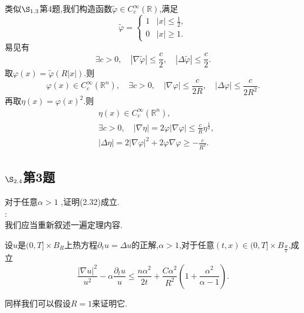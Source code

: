 \documentclass[12pt, a4paper]{ctexbook}
\begin{document}
    类似$\S_{1.3}$第4题,我们构造函数$\tilde{\varphi} \in C_c^{\infty}(\mathbb{R})$,满足
    \begin{equation*}
    \tilde{\varphi}=
    \begin{cases}
    1 & |x| \le \frac12,\\
    0 & |x| \ge 1.
    \end{cases}
    \end{equation*}
    易见有
    \begin{equation*}
    \exists c >0 ,\quad |\nabla \tilde{\varphi}|\le \frac{c}{2}, \quad |\Delta \tilde{\varphi}| \le \frac{c}{2}.
    \end{equation*}
    取$\varphi(x) = \tilde{\varphi}(R|x|)$.则
    \begin{equation*}
    \varphi(x)\in C_c^{\infty}(\mathbb{R}^n),\quad
    \exists c >0 ,\quad |\nabla \varphi|\le \frac{c}{2R}, \quad |\Delta \varphi| \le \frac{c}{2R^2}.
    \end{equation*}
    再取$\eta(x) = \varphi(x)^2$.则
    \begin{align*}
    &\eta(x)\in C_c^{\infty}(\mathbb{R}^n),\\
    &\exists c >0 ,\quad |\nabla \eta|= 2\varphi |\nabla \varphi|\le  \frac{c}{R}\eta^{\frac12}, \\
    &|\Delta \eta| = 2|\nabla \varphi|^2 + 2\varphi \nabla \varphi \ge -\frac{c}{R^2}.
    \end{align*}
    
    \subsection{$\S_{2.4}$第3题}
    \kaishu{}对于任意$\alpha>1$    ,证明(2.32)成立. \\
    
    \songti{}:\\
    
    我们应当重新叙述一遍定理内容.
    
    设$u$是$(0,T]\times B_R$上热方程$\partial_t u = \Delta u$的正解,$\alpha>1$,对于任意$(t,x) \in (0,T]\times B_{\frac{R}{2}}$,成立
    \begin{equation*}
    \frac{|\nabla u|^2}{u^2} - \alpha \frac{\partial_t u}{u}
    \le \frac{n \alpha^2}{2t} + \frac{C\alpha^2}{R^2}(1+\frac{\alpha^2}{\alpha-1}).
    \end{equation*}
    
    同样我们可以假设$R=1$来证明它.
    
\end{document}
